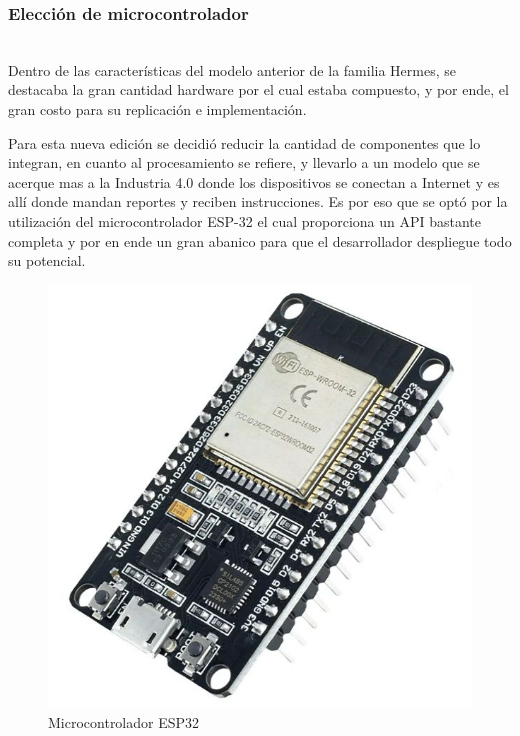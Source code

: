 \subsubsection{Elección de microcontrolador} \mbox{} \vspace{10pt} \\
Dentro de las características del modelo anterior de la familia Hermes, se destacaba la gran cantidad hardware por el cual estaba compuesto, y por ende, el gran costo para su replicación e implementación.

Para esta nueva edición se decidió reducir la cantidad de componentes que lo integran, en cuanto al procesamiento se refiere, y llevarlo a un modelo que se acerque mas a la Industria 4.0 donde los dispositivos se conectan a Internet y es allí donde mandan reportes y reciben instrucciones. Es por eso que se optó por la utilización del microcontrolador ESP-32 el cual proporciona un API bastante completa y por en ende un gran abanico para que el desarrollador despliegue todo su potencial.

\begin{figure}[H]
   \centering
   \includegraphics[width=0.4\linewidth]{images/esp32.jpeg}
   \caption{Microcontrolador ESP32}
   \label{fig:microcontrolador}
\end{figure}